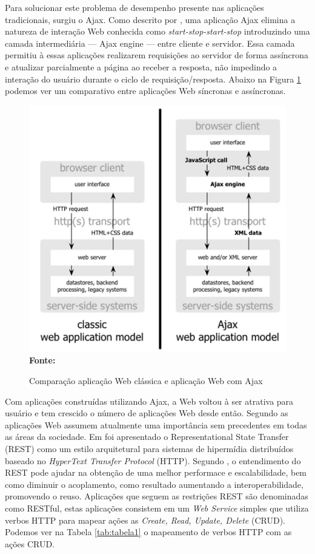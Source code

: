 Para solucionar este problema de desempenho presente nas aplicações tradicionais, surgiu o Ajax. Como descrito por \cite{garrettAjax}, uma aplicação
Ajax elimina a natureza de interação Web conhecida como \textit{start-stop-start-stop} introduzindo uma camada intermediária — Ajax engine — entre 
cliente e servidor. Essa camada permitiu à essas aplicações realizarem requisições ao servidor de forma assíncrona e atualizar parcialmente a 
página ao receber a resposta, não impedindo a interação do usuário durante o ciclo de requisição/resposta. Abaixo na Figura \ref{fig:ajax_comparison} 
podemos ver um comparativo entre aplicações Web síncronas e assíncronas.

\begin{figure}[!ht]
	\centering	
	\caption[\hspace{0.1cm}Comparação aplicação Web clássica e aplicação Web com Ajax.]{Comparação aplicação Web clássica e aplicação Web com Ajax}
	  \vspace{-0.4cm}
	\includegraphics[width=.8\textwidth]{figuras/ajax_comparison.png}
	 \vspace{-0.3cm}
	\\\textbf{\footnotesize Fonte: \cite{garrettAjax}}
	\label{fig:ajax_comparison}
\end{figure}


Com aplicações construídas utilizando Ajax, a Web voltou à ser atrativa para usuário e tem crescido o número de aplicações Web desde então. Segundo
\cite{tabulaRest} as aplicações Web assumem atualmente uma importância sem precedentes em todas as áreas da sociedade. Em \cite{fieldingRest} foi apresentado o Representational State Transfer (REST) 
como um estilo arquitetural para sistemas de hipermídia distribuídos baseado no \textit{HyperText Transfer Protocol} (HTTP). Segundo 
\cite{modelingRestful}, o entendimento do REST pode ajudar na obtenção de uma melhor performace e escalabilidade, bem como diminuir o acoplamento,
como resultado aumentando a interoperabilidade, promovendo o reuso. Aplicações que seguem as restrições REST são denominadas como RESTful, estas 
aplicações consistem em um \textit{Web Service} simples que utiliza verbos HTTP para mapear ações as \textit{Create, Read, Update, Delete} (CRUD). 
Podemos ver na Tabela \ref{tab:tabela1} o mapeamento de verbos HTTP com as ações CRUD.

